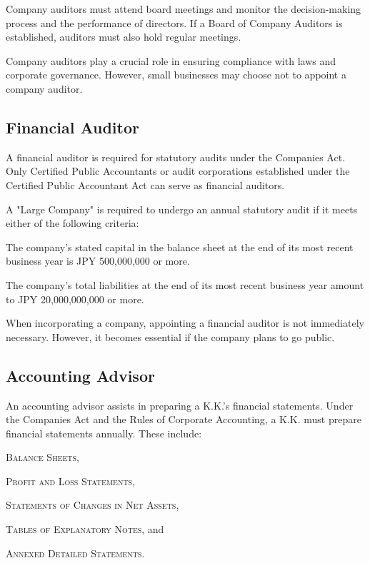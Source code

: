 Company auditors must attend board meetings and monitor the decision-making process and the performance of directors. If a Board of Company Auditors is established, auditors must also hold regular meetings.

Company auditors play a crucial role in ensuring compliance with laws and corporate governance. However, small businesses may choose not to appoint a company auditor.

\subsection{Financial Auditor}
A financial auditor is required for statutory audits under the Companies Act. Only Certified Public Accountants or audit corporations established under the Certified Public Accountant Act can serve as financial auditors.

A "Large Company" is required to undergo an annual statutory audit if it meets either of the following criteria:

\begin{coloritemize}

  \item The company's stated capital in the balance sheet at the end of its most recent business year is JPY 500,000,000 or more.
  \item The company's total liabilities at the end of its most recent business year amount to JPY 20,000,000,000 or more.

\end{coloritemize}

When incorporating a company, appointing a financial auditor is not immediately necessary. However, it becomes essential if the company plans to go public.

\subsection{Accounting Advisor}
An accounting advisor assists in preparing a K.K.'s financial statements. Under the Companies Act and the Rules of Corporate Accounting, a K.K. must prepare financial statements annually. These include:

\begin{coloritemize}
  \item \textsc{Balance Sheets},
  \item \textsc{Profit and Loss Statements},
  \item \textsc{Statements of Changes in Net Assets},
  \item \textsc{Tables of Explanatory Notes}, and
  \item \textsc{Annexed Detailed Statements}.
\end{coloritemize}

